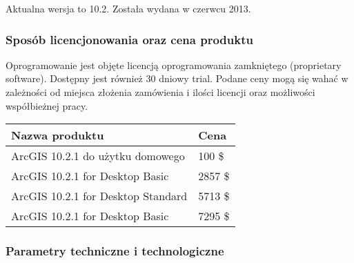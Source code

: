 \documentclass[11pt,a4paper]{article}
\begin{document}
 Aktualna wersja to 10.2. Została wydana w czerwcu 2013.

\subsubsection*{Sposób licencjonowania oraz cena produktu}

 Oprogramowanie jest objęte licencją oprogramowania zamkniętego (proprietary software). Dostępny jest również 30 dniowy trial. Podane ceny mogą się wahać w zależności od miejsca złożenia zamówienia i ilości licencji oraz możliwości współbieżnej pracy.

\centering
	\begin{tabular}{ | p{6cm}| p{6cm} | }
    	\hline
    	\textbf{Nazwa produktu} & \textbf{Cena}\\ \hline
	ArcGIS 10.2.1 do użytku domowego &  100 \$ \\ \hline
    	ArcGIS 10.2.1 for Desktop Basic & 2857 \$ \\ \hline
    	ArcGIS 10.2.1 for Desktop Standard & 5713 \$ \\ \hline
    	ArcGIS 10.2.1 for Desktop Basic & 7295 \$ \\ \hline
  	\end{tabular}
\raggedright
\subsubsection*{Parametry techniczne i technologiczne}
\end{document}
